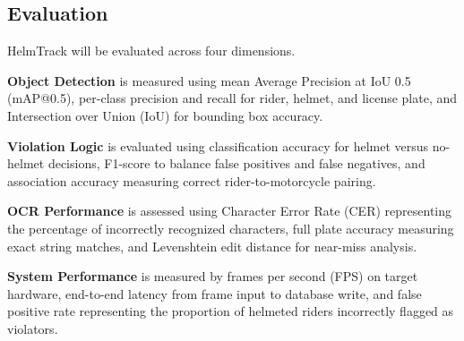 \subsection{Evaluation}

HelmTrack will be evaluated across four dimensions.

\textbf{Object Detection} is measured using mean Average Precision at IoU 0.5 (mAP@0.5), per-class precision and recall for rider, helmet, and license plate, and Intersection over Union (IoU) for bounding box accuracy.

\textbf{Violation Logic} is evaluated using classification accuracy for helmet versus no-helmet decisions, F1-score to balance false positives and false negatives, and association accuracy measuring correct rider-to-motorcycle pairing.

\textbf{OCR Performance} is assessed using Character Error Rate (CER) representing the percentage of incorrectly recognized characters, full plate accuracy measuring exact string matches, and Levenshtein edit distance for near-miss analysis.

\textbf{System Performance} is measured by frames per second (FPS) on target hardware, end-to-end latency from frame input to database write, and false positive rate representing the proportion of helmeted riders incorrectly flagged as violators.
